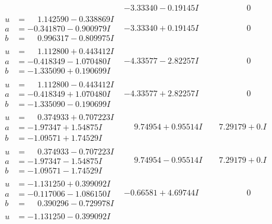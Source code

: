 \documentclass[1p]{elsarticle_modified}
\theoremstyle{definition}
\begin{document}
$$\begin{array}{c|c|c}
 & -3.33340 - 0.19145 I & \phantom{-0.000000 } 0 \\ \hline\begin{aligned}
u &= \phantom{-}1.142590 - 0.338869 I \\
a &= -0.341870 - 0.900979 I \\
b &= \phantom{-}0.996317 - 0.809975 I\end{aligned}
 & -3.33340 + 0.19145 I & \phantom{-0.000000 } 0 \\ \hline\begin{aligned}
u &= \phantom{-}1.112800 + 0.443412 I \\
a &= -0.418349 - 1.070480 I \\
b &= -1.335090 + 0.190699 I\end{aligned}
 & -4.33577 - 2.82257 I & \phantom{-0.000000 } 0 \\ \hline\begin{aligned}
u &= \phantom{-}1.112800 - 0.443412 I \\
a &= -0.418349 + 1.070480 I \\
b &= -1.335090 - 0.190699 I\end{aligned}
 & -4.33577 + 2.82257 I & \phantom{-0.000000 } 0 \\ \hline\begin{aligned}
u &= \phantom{-}0.374933 + 0.707223 I \\
a &= -1.97347 + 1.54875 I \\
b &= -1.09571 + 1.74529 I\end{aligned}
 & \phantom{-}9.74954 + 0.95514 I & \phantom{-}7.29179 + 0. I\phantom{ +0.000000I} \\ \hline\begin{aligned}
u &= \phantom{-}0.374933 - 0.707223 I \\
a &= -1.97347 - 1.54875 I \\
b &= -1.09571 - 1.74529 I\end{aligned}
 & \phantom{-}9.74954 - 0.95514 I & \phantom{-}7.29179 + 0. I\phantom{ +0.000000I} \\ \hline\begin{aligned}
u &= -1.131250 + 0.399092 I \\
a &= -0.117006 - 1.086150 I \\
b &= \phantom{-}0.390296 - 0.729978 I\end{aligned}
 & -0.66581 + 4.69744 I & \phantom{-0.000000 } 0 \\ \hline\begin{aligned}
u &= -1.131250 - 0.399092 I \\

\end{aligned}
\end{array}$$
\end{document}

